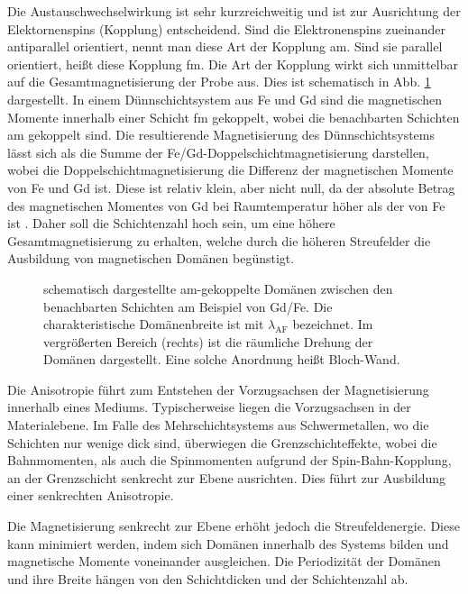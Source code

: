 \noindent
Die Austauschwechselwirkung ist sehr kurzreichweitig und ist zur Ausrichtung der Elektornenspins (Kopplung) entscheidend. Sind die Elektronenspins zueinander antiparallel orientiert, nennt man diese Art der Kopplung \gls{am}. Sind sie parallel orientiert, heißt diese Kopplung \gls{fm}. Die Art der Kopplung wirkt sich unmittelbar auf die Gesamtmagnetisierung der Probe aus. Dies ist schematisch in Abb. \ref{fig:am_fm_kopplung} dargestellt. In einem Dünnschichtsystem aus Fe und Gd sind die magnetischen Momente innerhalb einer Schicht \gls{fm} gekoppelt, wobei die benachbarten Schichten \gls{am} gekoppelt sind. Die resultierende Magnetisierung des Dünnschichtsystems lässt sich als die Summe der Fe/Gd-Doppelschichtmagnetisierung darstellen, wobei die Doppelschichtmagnetisierung die Differenz der magnetischen Momente von Fe und Gd ist. Diese ist relativ klein, aber nicht null, da der absolute Betrag des magnetischen Momentes von Gd bei Raumtemperatur höher als der von Fe ist \cite{hintermayr_structure_2021_fixed}. Daher soll die Schichtenzahl hoch sein, um eine höhere Gesamtmagnetisierung zu erhalten, welche durch die höheren Streufelder die Ausbildung von magnetischen Domänen begünstigt.
\begin{figure}[H]
    \centering
    
    \caption{schematisch dargestellte \gls{am}-gekoppelte Domänen zwischen den benachbarten Schichten am Beispiel von Gd/Fe. Die charakteristische Domänenbreite ist mit $\lambda_{\text{AF}}$ bezeichnet. Im vergrößerten Bereich (rechts) ist die räumliche Drehung der Domänen dargestellt. Eine solche Anordnung heißt Bloch-Wand.}
    \label{fig:am_fm_kopplung}
\end{figure}
\noindent
Die Anisotropie führt zum Entstehen der Vorzugsachsen der Magnetisierung innerhalb eines Mediums. Typischerweise liegen die Vorzugsachsen in der Materialebene. Im Falle des Mehrschichtsystems aus Schwermetallen, wo die Schichten nur wenige  dick sind, überwiegen die Grenzschichteffekte, wobei die Bahnmomenten, als auch die Spinmomenten aufgrund der Spin-Bahn-Kopplung, an der Grenzschicht senkrecht zur Ebene ausrichten. Dies führt zur Ausbildung einer senkrechten Anisotropie.

\noindent
Die Magnetisierung senkrecht zur Ebene erhöht jedoch die Streufeldenergie. Diese kann minimiert werden, indem sich Domänen innerhalb des Systems bilden und magnetische Momente voneinander ausgleichen. Die Periodizität der Domänen und ihre Breite hängen von den Schichtdicken und der Schichtenzahl ab. 

